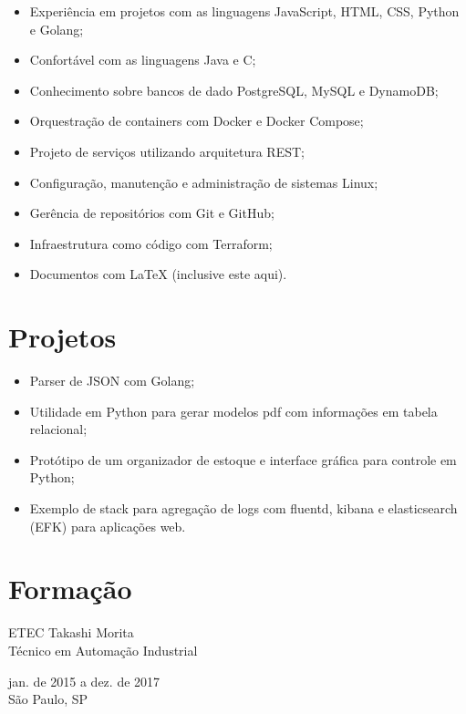 \documentclass{article}
\begin{document}
\begin{itemize}
    \item Experi\^{e}ncia em projetos com as linguagens JavaScript, HTML, CSS,
    Python e Golang;
    \item Confortável com as linguagens Java e C;
    \item Conhecimento sobre bancos de dado PostgreSQL, MySQL e DynamoDB;
    \item Orquestração de containers com Docker e Docker Compose;
    \item Projeto de serviços utilizando arquitetura REST;
    \item Configuração, manutenção e administração de sistemas Linux;
    \item Gerência de repositórios com Git e GitHub;
    \item Infraestrutura como código com Terraform;
    \item Documentos com {\LaTeX} (inclusive este aqui).
\end{itemize}

\section{Projetos}

\begin{itemize}
    \item Parser de JSON com Golang;
    \item Utilidade em Python para gerar modelos pdf com informações em tabela
    relacional;
    \item Protótipo de um organizador de estoque e interface gráfica para
    controle em Python;
    \item Exemplo de stack para agregação de logs com fluentd, kibana e
    elasticsearch (EFK) para aplicações web.
\end{itemize}

\section{Formação}

\begin{multicols}{2}
    \noindent
    \begin{flushleft}
        ETEC Takashi Morita \\
        Técnico em Automação Industrial
    \end{flushleft}
    \columnbreak
    \begin{flushright}
        jan. de 2015 a dez. de 2017 \\
        São Paulo, SP
    \end{flushright}
\end{multicols}
\end{document}
